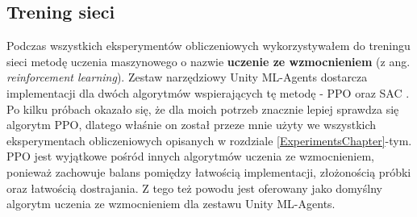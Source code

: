 \subsection*{Trening sieci}
Podczas wszystkich eksperymentów obliczeniowych wykorzystywałem do treningu sieci metodę uczenia maszynowego o nazwie \textbf{uczenie ze wzmocnieniem} (z ang. \textit{reinforcement learning}). Zestaw narzędziowy Unity ML-Agents dostarcza implementacji dla dwóch algorytmów wspierających tę metodę - PPO \cite{ppo:opis} oraz SAC \cite{sac:opis}. Po kilku próbach okazało się, że dla moich potrzeb znacznie lepiej sprawdza się algorytm PPO, dlatego właśnie on został przeze mnie użyty we wszystkich eksperymentach obliczeniowych opisanych w rozdziale \ref{ExperimentsChapter}-tym. PPO jest wyjątkowe pośród innych algorytmów uczenia ze wzmocnieniem, ponieważ zachowuje balans pomiędzy łatwością implementacji, złożonością próbki oraz łatwością dostrajania. Z tego też powodu jest oferowany jako domyślny algorytm uczenia ze wzmocnieniem dla zestawu Unity ML-Agents.
